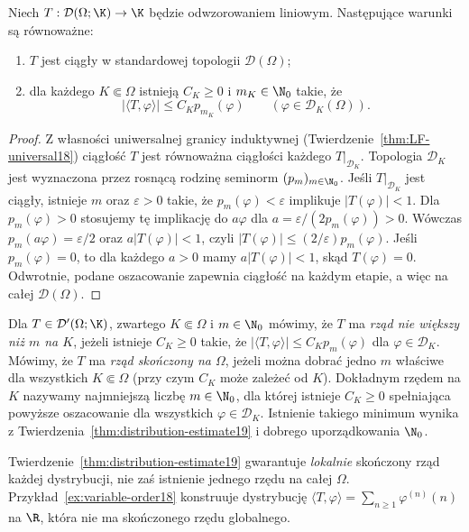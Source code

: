 \begin{twierdzenie}
\label{thm:distribution-estimate19}
Niech $T:\mathcal D(\Omega;\K)\to\K$ będzie odwzorowaniem
liniowym. Następujące warunki są równoważne:
\begin{enumerate}
\item $T$ jest ciągły w standardowej topologii $\mathcal D(\Omega)$;
\item dla każdego $K\Subset\Omega$ istnieją $C_K\ge0$
i $m_K\in\N_0$ takie, że
\[|\langle T,\varphi\rangle|\le C_K p_{m_K}(\varphi)
\qquad(\varphi\in\mathcal D_K(\Omega)).\]
\end{enumerate}
\end{twierdzenie}
\begin{proof}
Z własności uniwersalnej granicy induktywnej
(Twierdzenie~\ref{thm:LF-universal18}) ciągłość $T$
jest równoważna ciągłości każdego
$T|_{\mathcal D_K}$. Topologia $\mathcal D_K$ jest wyznaczona
przez rosnącą rodzinę seminorm $(p_m)_{m\in\N_0}$.
Jeśli $T|_{\mathcal D_K}$ jest ciągły, istnieje $m$ oraz
$\varepsilon>0$ takie, że $p_m(\varphi)<\varepsilon$
implikuje $|T(\varphi)|<1$. Dla $p_m(\varphi)>0$ stosujemy
tę implikację do $a\varphi$ dla
$a=\varepsilon/(2p_m(\varphi))>0$.
Wówczas $p_m(a\varphi)=\varepsilon/2$ oraz
$a|T(\varphi)|<1$, czyli
$|T(\varphi)|\le(2/\varepsilon)p_m(\varphi)$.
Jeśli $p_m(\varphi)=0$, to dla każdego $a>0$ mamy
$a|T(\varphi)|<1$, skąd $T(\varphi)=0$. Odwrotnie, podane oszacowanie
zapewnia ciągłość na każdym etapie, a więc na całej
$\mathcal D(\Omega)$.
\end{proof}

\begin{definicja}
\label{def:order19}
Dla $T\in\mathcal D'(\Omega;\K)$, zwartego $K\Subset\Omega$
i $m\in\N_0$ mówimy,
że $T$ ma \emph{rząd nie większy niż $m$ na $K$}, jeżeli
istnieje $C_K\ge0$ takie, że
$|\langle T,\varphi\rangle|\le C_K p_m(\varphi)$
dla $\varphi\in\mathcal D_K$. Mówimy, że $T$ ma
\emph{rząd skończony na $\Omega$}, jeżeli można dobrać
jedno $m$ właściwe dla wszystkich $K\Subset\Omega$
(przy czym $C_K$ może zależeć od $K$).
Dokładnym rzędem na $K$ nazywamy najmniejszą liczbę
$m\in\N_0$, dla której istnieje $C_K\ge0$ spełniająca
powyższe oszacowanie dla wszystkich $\varphi\in\mathcal D_K$.
Istnienie takiego minimum wynika z
Twierdzenia~\ref{thm:distribution-estimate19} i dobrego
uporządkowania $\N_0$.
\end{definicja}

\begin{uwaga}
\label{rem:order-local19}
Twierdzenie~\ref{thm:distribution-estimate19} gwarantuje
\emph{lokalnie} skończony rząd każdej dystrybucji,
nie zaś istnienie jednego rzędu na całej $\Omega$.
Przykład~\ref{ex:variable-order18} konstruuje dystrybucję
$\langle T,\varphi\rangle=\sum_{n\ge1}\varphi^{(n)}(n)$
na $\R$, która nie ma skończonego rzędu globalnego.
\end{uwaga}

